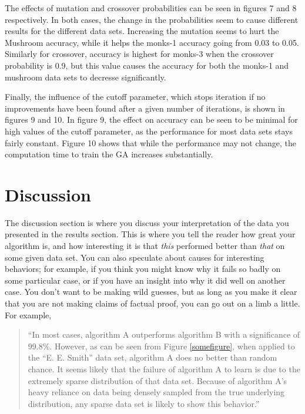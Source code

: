 \documentclass[12pt, letterpaper]{article}
\begin{document}
The effects of mutation and crossover probabilities can be seen in figures 7 
and 8 respectively.  In both cases, the change in the probabilities seem to 
cause different results for the different data sets.  Increasing the mutation
seems to hurt the Mushroom accuracy, while it helps the monks-1 accuracy going
from 0.03 to 0.05.  Similarly for crossover, accuracy is highest for monks-3 
when the crossover probability is 0.9, but this value causes the accuracy for
both the monks-1 and mushroom data sets to decresse significantly.  

Finally, the influence of the cutoff parameter, which stops iteration if no
improvements have been found after a given number of iterations, is shown in
figures 9 and 10. In figure 9, the effect on accuracy can be seen to be minimal
for high values of the cutoff parameter, as the performance for most data sets
stays fairly constant. Figure 10 shows that while the performance may not 
change, the computation time to train the GA increases substantially.    


\section{Discussion}
The discussion section is where you discuss your interpretation of the data you
presented in the results section.  This is where you tell the reader how great
your algorithm is, and how interesting it is that \emph{this} performed better
than \emph{that} on some given data set.  You can also speculate about causes
for interesting behaviors; for example, if you think you might know why it fails
so badly on some particular case, or if you have an insight into why it did well
on another case.  You don't want to be making wild guesses, but as long as you
make it clear that you are not making claims of factual proof, you can go out on
a limb a little.  For example,

\begin{quote}
``In most cases, algorithm A outperforms algorithm B with a significance of
99.8\%.  However, as can be seen from Figure \ref{somefigure}, when applied to
the ``E. E. Smith'' data set, algorithm A does no better than random chance.  It
seems likely that the failure of algorithm A to learn is due to the extremely
sparse distribution of that data set.  Because of algorithm A's heavy reliance
on data being densely sampled from the true underlying distribution, any sparse
data set is likely to show this behavior.''
\end{quote}
\end{document}
